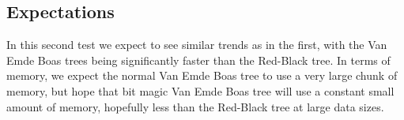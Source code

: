 \subsection{Expectations}

In this second test we expect to see similar trends as in the first, with the Van Emde Boas trees being significantly faster than the Red-Black tree. In terms of memory, we expect the normal Van Emde Boas tree to use a very large chunk of memory, but hope that bit magic Van Emde Boas tree will use a constant small amount of memory, hopefully less than the Red-Black tree at large data sizes.